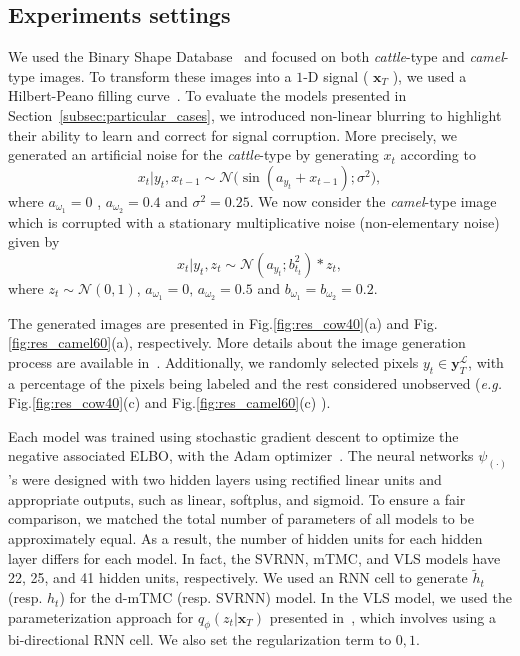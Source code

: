 \documentclass{article}
\def\x{{\mathbf x}}
\def\yl{{\mathbf y}_{T}^{\mathcal{L}}}
\def\q{q_\phi}
\begin{document}
\subsection{Experiments settings}
We used the Binary Shape Database~\cite{binaryimg} and focused 
on both \textit{cattle}-type and \textit{camel}-type images. 
To transform these images into a $1$-D signal ( $\x_T$ ), we used a Hilbert-Peano filling curve~\cite{sagan2012space}. 
To evaluate the models presented in Section~\ref{subsec:particular_cases},
we introduced non-linear blurring to highlight their ability to learn and
correct for signal corruption. 
More precisely, we generated an artificial noise for the \textit{cattle}-type by
generating $x_t$ according to
\begin{equation}
    \label{eq:noise_eq1}
    x_t| y_{t},x_{t-1} \sim \mathcal{N}\Big(\sin(a_{y_t}+x_{t-1});
    \sigma^2\Big),
\end{equation}
where $a_{\omega_1}=0$ , $a_{\omega_2} = 0.4$ and $\sigma^2=0.25$. 
We now consider the \textit{camel}-type image which is corrupted 
with a stationary multiplicative noise (non-elementary noise) given by
\begin{equation}
\label{eq:noise_eq2}
    x_t|y_t,z_t \sim\mathcal{N}\left(a_{y_t};b_{t_t}^2\right) * z_t,
\end{equation}
where $z_t\sim\mathcal{N}(0, 1)$, $a_{\omega_1}=0\text{, } a_{\omega_2} = 0.5$ and $b_{\omega_1}=b_{\omega_2}=0.2$. 

The generated images are presented in Fig.\ref{fig:res_cow40}(a) 
and Fig.\ref{fig:res_camel60}(a), respectively. 
More details about the image generation process are
available in~\cite{gangloff2023deep}. Additionally, we randomly selected
pixels $y_t \in \yl$, with a percentage of the pixels being labeled and the rest considered unobserved (\textit{e.g.} Fig.\ref{fig:res_cow40}(c) 
and Fig.\ref{fig:res_camel60}(c) ). %

Each model was trained using stochastic gradient descent to optimize the negative associated ELBO, with the Adam optimizer~\cite{adam}. The neural networks $\psi_{(\cdot)}$'s were designed with two hidden layers using rectified linear units and appropriate outputs, such as linear, softplus, and sigmoid. To ensure a fair comparison, we matched the total number of parameters of all models to be approximately equal. As a result, the number of hidden units for each hidden layer differs for each model. In fact, the SVRNN, mTMC, and VLS models have 22, 25, and 41 hidden units, respectively.
We used an RNN cell to generate $\tilde{h}_t$ (resp. $h_t$) for the d-mTMC (resp. SVRNN) model. In the VLS model, we used the parameterization approach for $\q(z_t|\x_T)$ presented in~\cite{chen2019variational}, which involves using a bi-directional RNN cell. We also set the regularization term to $0,1$.
\end{document}
